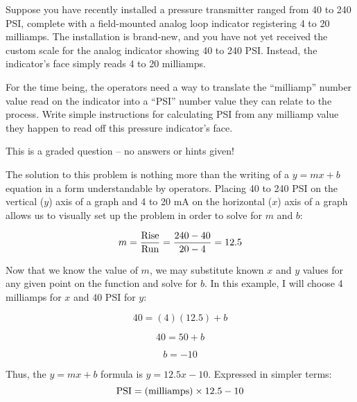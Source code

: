 

Suppose you have recently installed a pressure transmitter ranged from 40 to 240 PSI, complete with a field-mounted analog loop indicator registering 4 to 20 milliamps.  The installation is brand-new, and you have not yet received the custom scale for the analog indicator showing 40 to 240 PSI.  Instead, the indicator's face simply reads 4 to 20 milliamps.

\vskip 10pt

For the time being, the operators need a way to translate the ``milliamp'' number value read on the indicator into a ``PSI'' number value they can relate to the process.  Write simple instructions for calculating PSI from any milliamp value they happen to read off this pressure indicator's face.

\vfil

\eject






This is a graded question -- no answers or hints given!







The solution to this problem is nothing more than the writing of a $y = mx + b$ equation in a form understandable by operators.  Placing 40 to 240 PSI on the vertical ($y$) axis of a graph and 4 to 20 mA on the horizontal ($x$) axis of a graph allows us to visually set up the problem in order to solve for $m$ and $b$:

$$m = {\hbox{Rise} \over \hbox{Run}} = {240 - 40 \over 20 - 4} = 12.5$$

Now that we know the value of $m$, we may substitute known $x$ and $y$ values for any given point on the function and solve for $b$.  In this example, I will choose 4 milliamps for $x$ and 40 PSI for $y$:

$$40 = (4)(12.5) + b$$

$$40 = 50 + b$$

$$b = -10$$

Thus, the $y = mx + b$ formula is $y = 12.5x - 10$.  Expressed in simpler terms:
$$\hbox{PSI} = (\hbox{milliamps}) \times 12.5 - 10$$

